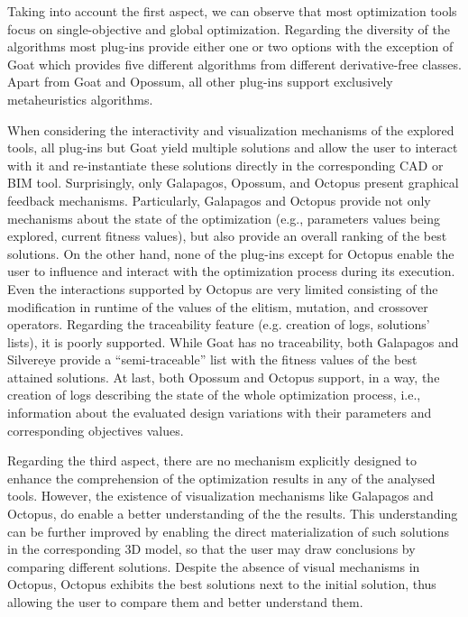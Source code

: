Taking into account the first aspect, we can observe that most optimization tools focus on single-objective and global optimization. Regarding the diversity of the algorithms most plug-ins provide either one or two options with the exception of Goat which provides five different algorithms from different derivative-free classes. Apart from Goat and Opossum, all other plug-ins support exclusively metaheuristics algorithms.

When considering the interactivity and visualization mechanisms of the explored tools, all plug-ins but Goat yield multiple solutions and allow the user to interact with it and re-instantiate these solutions directly in the corresponding \ac{CAD} or \ac{BIM} tool. Surprisingly, only Galapagos, Opossum, and Octopus present graphical feedback mechanisms. Particularly, Galapagos and Octopus provide not only mechanisms about the state of the optimization (e.g., parameters values being explored, current fitness values), but also provide an overall ranking of the best solutions. On the other hand, none of the plug-ins except for Octopus enable the user to influence and interact with the optimization process during its execution. Even the interactions supported by Octopus are very limited consisting of the modification in runtime of the values of the elitism, mutation, and crossover operators. Regarding the traceability feature (e.g. creation of logs, solutions' lists), it is poorly supported. While Goat has no traceability, both Galapagos and Silvereye provide a ``semi-traceable'' list with the fitness values of the best attained solutions. At last, both Opossum and Octopus support, in a way, the creation of logs describing the state of the whole optimization process, i.e., information about the evaluated design variations with their parameters and corresponding objectives values.

Regarding the third aspect, there are no mechanism explicitly designed to enhance the comprehension of the optimization results in any of the analysed tools. However, the existence of visualization mechanisms like Galapagos and Octopus, do enable a better understanding of the the results. This understanding can be further improved by enabling the direct materialization of such solutions in the corresponding 3D model, so that the user may draw conclusions by comparing different solutions. Despite the absence of visual mechanisms in Octopus, Octopus exhibits the best solutions next to the initial solution, thus allowing the user to compare them and better understand them.

